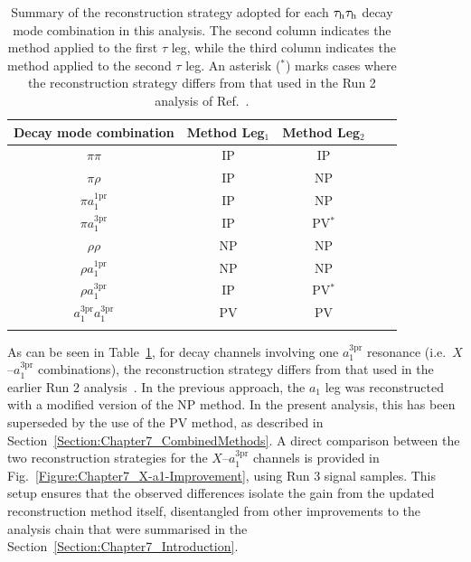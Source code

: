 \begin{table}[!htbp]
\centering
\renewcommand{\arraystretch}{1.5} %
\setlength{\tabcolsep}{10pt} %
\begin{tabular}{ccccc}
\hline
Decay mode combination & Method Leg$_1$ & Method Leg$_2$\\
\hline
$\pi\pi$       & \ac{IP} & \ac{IP} \\
\arrayrulecolor{lightgray} \hline
$\pi\rho$       & \ac{IP} & \ac{NP} \\
\arrayrulecolor{lightgray} \hline
$\pi a_1^\text{1pr}$       & \ac{IP} & \ac{NP} \\
\arrayrulecolor{lightgray} \hline
$\pi a_1^\text{3pr}$       & \ac{IP} & \ac{PV}$^*$ \\
\arrayrulecolor{lightgray} \hline
$\rho\rho$       & \ac{NP} & \ac{NP} \\
\arrayrulecolor{lightgray} \hline
$\rho a_1^\text{1pr}$       & \ac{NP} & \ac{NP} \\
\arrayrulecolor{lightgray} \hline
$\rho a_1^\text{3pr}$       & \ac{IP} & \ac{PV}$^*$ \\
\arrayrulecolor{lightgray} \hline
$a_1^\text{3pr} a_1^\text{3pr}$       & \ac{PV} & \ac{PV} \\
\arrayrulecolor{black} \hline
\end{tabular}
\caption[Summary of reconstruction methods per $\tauh\tauh$ decay mode combination.]
{Summary of the reconstruction strategy adopted for each $\tauh\tauh$ decay mode combination in this analysis. The second column indicates the method applied to the first $\tau$ leg, while the third column indicates the method applied to the second $\tau$ leg. An asterisk ($^*$) marks cases where the reconstruction strategy differs from that used in the Run 2 analysis of Ref.~\cite{HiggsCP_CMS_2021}.}
\label{Table:Chapter7_ReconstructionMethodSummary}
\end{table}

As can be seen in Table~\ref{Table:Chapter7_ReconstructionMethodSummary}, for decay channels involving one $a_1^{3\mathrm{pr}}$ resonance (i.e.\ $X$–$a_1^{3\mathrm{pr}}$ combinations), the reconstruction strategy differs from that used in the earlier Run 2 analysis~\cite{HiggsCP_CMS_2021}. In the previous approach, the $a_1$ leg was reconstructed with a modified version of the \ac{NP} method. In the present analysis, this has been superseded by the use of the \ac{PV} method, as described in Section~\ref{Section:Chapter7_CombinedMethods}. A direct comparison between the two reconstruction strategies for the $X$–$a_1^{3\mathrm{pr}}$ channels is provided in Fig.~\ref{Figure:Chapter7_X-a1-Improvement}, using Run 3 signal samples. This setup ensures that the observed differences isolate the gain from the updated reconstruction method itself, disentangled from other improvements to the analysis chain that were summarised in the Section~\ref{Section:Chapter7_Introduction}.

